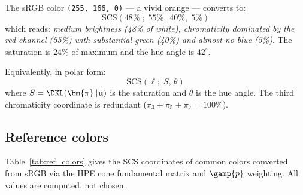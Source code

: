 \documentclass[12pt,a4paper]{article}
\begin{document}
\begin{example}
The sRGB color \texttt{(255, 166, 0)} --- a vivid orange --- converts
to:
\[
  \mathrm{SCS}(48\%\;;\; 55\%,\; 40\%,\; 5\%)
\]
which reads: \emph{medium brightness (48\% of white), chromaticity
dominated by the red channel (55\%) with substantial green (40\%)
and almost no blue (5\%)}. The saturation is $24\%$ of maximum and
the hue angle is $42^\circ$.
\end{example}

Equivalently, in polar form:
\begin{equation}
  \mathrm{SCS}(\ell;\; S,\, \theta)
\end{equation}
where $S = \DKL(\bm{\pi}\|\mathbf{u})$ is the saturation and $\theta$
is the hue angle. The third chromaticity coordinate is redundant
($\pi_3 + \pi_5 + \pi_7 = 100\%$).

\subsection{Reference colors}

Table~\ref{tab:ref_colors} gives the SCS coordinates of common colors
converted from sRGB via the HPE cone fundamental matrix and $\gamp{p}$
weighting. All values are computed, not chosen.
\end{document}
